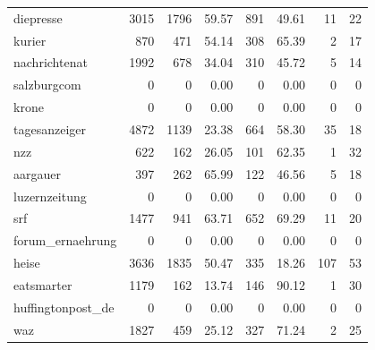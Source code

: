 \begin{table}
\begin{tabular}{lrrrrrrr}
		diepresse          &           3015 &              1796 &         59.57 &        891 &         49.61 &            11 &                22 \\
		kurier             &            870 &               471 &         54.14 &        308 &         65.39 &             2 &                17 \\
		nachrichtenat      &           1992 &               678 &         34.04 &        310 &         45.72 &             5 &                14 \\
		salzburgcom        &              0 &                 0 &          0.00 &          0 &          0.00 &             0 &                 0 \\
		krone              &              0 &                 0 &          0.00 &          0 &          0.00 &             0 &                 0 \\
		tagesanzeiger      &           4872 &              1139 &         23.38 &        664 &         58.30 &            35 &                18 \\
		nzz                &            622 &               162 &         26.05 &        101 &         62.35 &             1 &                32 \\
		aargauer           &            397 &               262 &         65.99 &        122 &         46.56 &             5 &                18 \\
		luzernzeitung      &              0 &                 0 &          0.00 &          0 &          0.00 &             0 &                 0 \\
		srf                &           1477 &               941 &         63.71 &        652 &         69.29 &            11 &                20 \\
		forum\_ernaehrung  &              0 &                 0 &          0.00 &          0 &          0.00 &             0 &                 0 \\
		heise              &           3636 &              1835 &         50.47 &        335 &         18.26 &           107 &                53 \\
		eatsmarter         &           1179 &               162 &         13.74 &        146 &         90.12 &             1 &                30 \\
		huffingtonpost\_de &              0 &                 0 &          0.00 &          0 &          0.00 &             0 &                 0 \\
		waz                &           1827 &               459 &         25.12 &        327 &         71.24 &             2 &                25 \\

\end{tabular}
\end{table}
